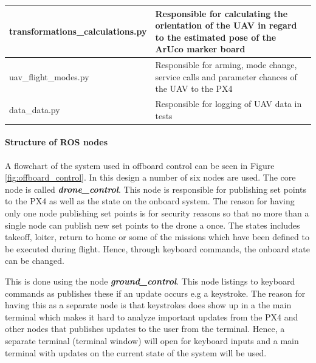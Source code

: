 \documentclass[../Head/report.tex]{subfiles}
\begin{document}
\begin{table}[H]
\begin{center}
\begin{tabularx}{\textwidth}[t]{XX}
\hline
transformations\_calculations.py &
\begin{minipage}[t]{\linewidth}%
Responsible for calculating the orientation of the UAV in regard to the estimated pose of the ArUco marker board   
\end{minipage}\vspace{0.5em}\\

\hline
uav\_flight\_modes.py &
\begin{minipage}[t]{\linewidth}%
Responsible for arming, mode change, service calls and parameter chances of the UAV to the PX4    
\end{minipage}\vspace{0.5em}\\

\hline
data\_data.py &
\begin{minipage}[t]{\linewidth}%
Responsible for logging of UAV data in tests   
\end{minipage}\\
\end{tabularx}
\end{center}
\end{table}


\renewcommand{\arraystretch}{1.0}



\paragraph{Structure of ROS nodes}
\label{sec:structure_of_ros_nodes}

A flowchart of the system used in offboard control can be seen in Figure \ref{fig:offboard_control}. In this design a number of six nodes are used. The core node is called \textit{\textbf{drone\_control}}. This node is responsible for publishing set points to the PX4 as well as the state on the onboard system. The reason for having only one node publishing set points is for security reasons so that no more than a single node can publish new set points to the drone a once. The states includes takeoff, loiter, return to home or some of the missions which have been defined to be executed during flight. Hence, through keyboard commands, the onboard state can be changed. 

This is done using the node \textit{\textbf{ground\_control}}. This node listings to keyboard commands as publishes these if an update occurs e.g a keystroke. The reason for having this as a separate node is that keystrokes does show up in a the main terminal which makes it hard to analyze important updates from the PX4 and other nodes that publishes updates to the user from the terminal. Hence, a separate terminal (terminal window) will open for keyboard inputs and a main terminal with updates on the current state of the system will be used. 
\end{document}

